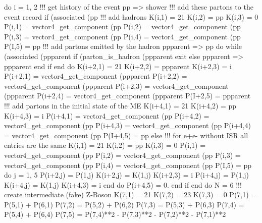     do i = 1, 2
       !!! get history of the event
       pp => shower%
       !!! add these partons to the event record
       if (associated (pp%
          !!! add hadrons
          K(i,1) = 21
          K(i,2) = pp%
          K(i,3) = 0
          P(i,1) = vector4_get_component (pp%
          P(i,2) = vector4_get_component (pp%
          P(i,3) = vector4_get_component (pp%
          P(i,4) = vector4_get_component (pp%
          P(I,5) = pp%
          !!! add partons emitted by the hadron
          ppparent => pp
          do while (associated (ppparent%
             if (parton_is_hadron (ppparent%
                exit
             else
                ppparent => ppparent%
             end if
          end do
          K(i+2,1) = 21
          K(i+2,2) = ppparent%
          K(i+2,3) = i
          P(i+2,1) = vector4_get_component (ppparent%
          P(i+2,2) = vector4_get_component (ppparent%
          P(i+2,3) = vector4_get_component (ppparent%
          P(i+2,4) = vector4_get_component (ppparent%
          P(I+2,5) = ppparent%
          !!! add partons in the initial state of the ME
          K(i+4,1) = 21
          K(i+4,2) = pp%
          K(i+4,3) = i
          P(i+4,1) = vector4_get_component (pp%
          P(i+4,2) = vector4_get_component (pp%
          P(i+4,3) = vector4_get_component (pp%
          P(i+4,4) = vector4_get_component (pp%
          P(I+4,5) = pp%
       else
          !!! for e+e- without ISR all entries are the same
          K(i,1) = 21
          K(i,2) = pp%
          K(i,3) = 0
          P(i,1) = vector4_get_component (pp%
          P(i,2) = vector4_get_component (pp%
          P(i,3) = vector4_get_component (pp%
          P(i,4) = vector4_get_component (pp%
          P(I,5) = pp%
          do j = 1, 5
             P(i+2,j) = P(1,j)
             K(i+2,j) = K(1,j)
             K(i+2,3) = i
             P(i+4,j) = P(1,j)
             K(i+4,j) = K(1,j)
             K(i+4,3) = i
          end do
          P(i+4,5) = 0.
       end if
    end do
    N = 6
    !!! create intermediate (fake) Z-Boson
    K(7,1) = 21
    K(7,2) = 23
    K(7,3) = 0
    P(7,1) = P(5,1) + P(6,1)
    P(7,2) = P(5,2) + P(6,2)
    P(7,3) = P(5,3) + P(6,3)
    P(7,4) = P(5,4) + P(6,4)
    P(7,5) = P(7,4)**2 - P(7,3)**2 - P(7,2)**2 - P(7,1)**2
